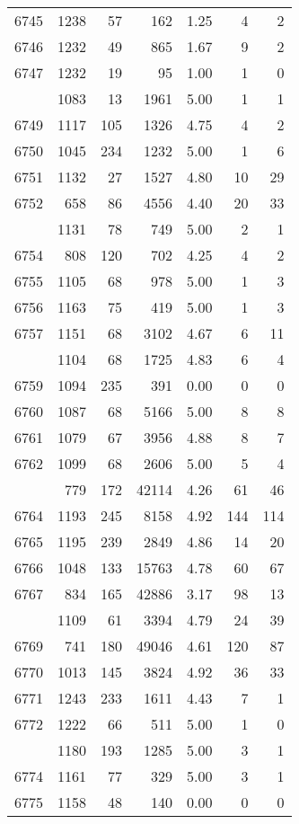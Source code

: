 \documentclass[
]{article}
\begin{document}
\begin{table}
\begin{tabular}[t]{lrrrrrr}
6745 & 1238 & 57 & 162 & 1.25 & 4 & 2\\
6746 & 1232 & 49 & 865 & 1.67 & 9 & 2\\
6747 & 1232 & 19 & 95 & 1.00 & 1 & 0\\
\addlinespace
6748 & 1083 & 13 & 1961 & 5.00 & 1 & 1\\
6749 & 1117 & 105 & 1326 & 4.75 & 4 & 2\\
6750 & 1045 & 234 & 1232 & 5.00 & 1 & 6\\
6751 & 1132 & 27 & 1527 & 4.80 & 10 & 29\\
6752 & 658 & 86 & 4556 & 4.40 & 20 & 33\\
\addlinespace
6753 & 1131 & 78 & 749 & 5.00 & 2 & 1\\
6754 & 808 & 120 & 702 & 4.25 & 4 & 2\\
6755 & 1105 & 68 & 978 & 5.00 & 1 & 3\\
6756 & 1163 & 75 & 419 & 5.00 & 1 & 3\\
6757 & 1151 & 68 & 3102 & 4.67 & 6 & 11\\
\addlinespace
6758 & 1104 & 68 & 1725 & 4.83 & 6 & 4\\
6759 & 1094 & 235 & 391 & 0.00 & 0 & 0\\
6760 & 1087 & 68 & 5166 & 5.00 & 8 & 8\\
6761 & 1079 & 67 & 3956 & 4.88 & 8 & 7\\
6762 & 1099 & 68 & 2606 & 5.00 & 5 & 4\\
\addlinespace
6763 & 779 & 172 & 42114 & 4.26 & 61 & 46\\
6764 & 1193 & 245 & 8158 & 4.92 & 144 & 114\\
6765 & 1195 & 239 & 2849 & 4.86 & 14 & 20\\
6766 & 1048 & 133 & 15763 & 4.78 & 60 & 67\\
6767 & 834 & 165 & 42886 & 3.17 & 98 & 13\\
\addlinespace
6768 & 1109 & 61 & 3394 & 4.79 & 24 & 39\\
6769 & 741 & 180 & 49046 & 4.61 & 120 & 87\\
6770 & 1013 & 145 & 3824 & 4.92 & 36 & 33\\
6771 & 1243 & 233 & 1611 & 4.43 & 7 & 1\\
6772 & 1222 & 66 & 511 & 5.00 & 1 & 0\\
\addlinespace
6773 & 1180 & 193 & 1285 & 5.00 & 3 & 1\\
6774 & 1161 & 77 & 329 & 5.00 & 3 & 1\\
6775 & 1158 & 48 & 140 & 0.00 & 0 & 0\\

\end{tabular}
\end{table}
\end{document}

